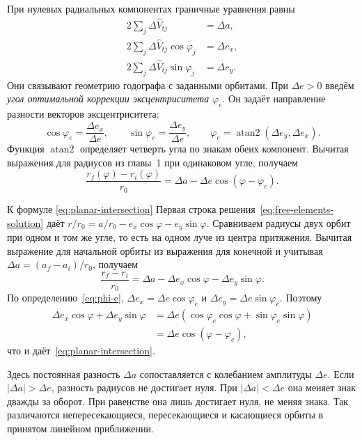 При нулевых радиальных компонентах граничные уравнения равны
\begin{equation}
\begin{aligned}
 2\sum_j\Delta\widehat V_{tj}&=\Delta a,\\
 2\sum_j\Delta\widehat V_{tj}\cos\varphi_j&=\Delta e_x,\\
 2\sum_j\Delta\widehat V_{tj}\sin\varphi_j&=\Delta e_y.
\end{aligned}
\label{eq:planar-boundaries}
\end{equation}
Они связывают геометрию годографа с заданными орбитами.
При $\Delta e>0$ введём \emph{угол оптимальной коррекции эксцентриситета}
$\varphi_e$. Он задаёт направление разности векторов эксцентриситета:
\begin{equation}
 \cos\varphi_e=\frac{\Delta e_x}{\Delta e},\qquad
 \sin\varphi_e=\frac{\Delta e_y}{\Delta e},\qquad
 \varphi_e=\operatorname{atan2}(\Delta e_y,\Delta e_x).
 \label{eq:phi-e}
\end{equation}
Функция $\operatorname{atan2}$ определяет четверть угла по знакам обеих компонент.
Вычитая выражения для радиусов из главы~1 при одинаковом угле, получаем
\begin{equation}
 \frac{r_f(\varphi)-r_i(\varphi)}{r_0}
 =\Delta a-\Delta e\cos(\varphi-\varphi_e).
 \label{eq:planar-intersection}
\end{equation}
\begin{explanation}{К формуле \eqref{eq:planar-intersection}}
Первая строка решения~\eqref{eq:free-elements-solution} даёт
$r/r_0=a/r_0-e_x\cos\varphi-e_y\sin\varphi$.
Сравниваем радиусы двух орбит при одном и том же угле, то есть
на одном луче из центра притяжения. Вычитая выражение для начальной
орбиты из выражения для конечной и учитывая
$\Delta a=(a_f-a_i)/r_0$, получаем
\[
 \frac{r_f-r_i}{r_0}
 =\Delta a-\Delta e_x\cos\varphi-\Delta e_y\sin\varphi.
\]
По определению~\eqref{eq:phi-e},
$\Delta e_x=\Delta e\cos\varphi_e$ и
$\Delta e_y=\Delta e\sin\varphi_e$. Поэтому
\[
\begin{aligned}
 \Delta e_x\cos\varphi+\Delta e_y\sin\varphi
 &=\Delta e(\cos\varphi_e\cos\varphi+\sin\varphi_e\sin\varphi)\\
 &=\Delta e\cos(\varphi-\varphi_e),
\end{aligned}
\]
что и даёт~\eqref{eq:planar-intersection}.
\end{explanation}
Здесь постоянная разность $\Delta a$ сопоставляется с колебанием
амплитуды $\Delta e$. Если $|\Delta a|>\Delta e$, разность радиусов
не достигает нуля. При $|\Delta a|<\Delta e$ она меняет знак дважды
за оборот. При равенстве она лишь достигает нуля, не меняя знака.
Так различаются непересекающиеся, пересекающиеся и касающиеся орбиты
в принятом линейном приближении.

